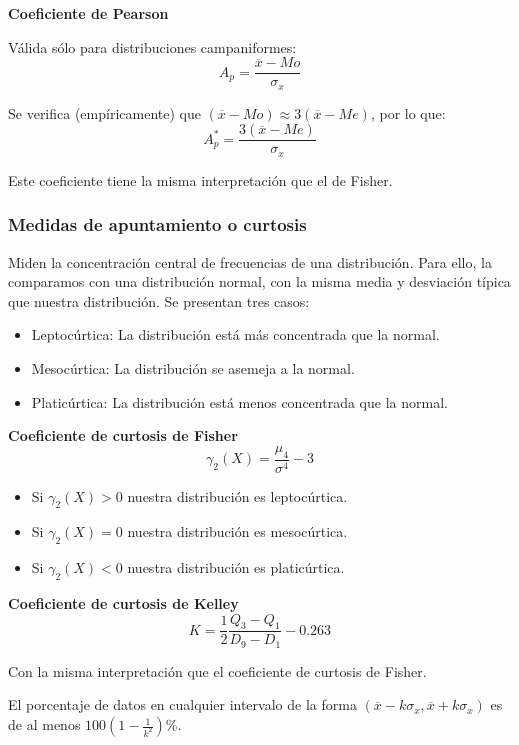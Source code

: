 \textbf{Coeficiente de Pearson}

Válida sólo para distribuciones campaniformes:
$$A_p = \dfrac{\overline{x} - Mo}{\sigma_x}$$

Se verifica (empíricamente) que $(\overline{x}-Mo) \approx 3(\overline{x}-Me)$, por lo que:
$$A_p^\ast = \dfrac{3(\overline{x} - Me)}{\sigma_x}$$

Este coeficiente tiene la misma interpretación que el de Fisher.


\subsubsection{Medidas de apuntamiento o curtosis}


Miden la concentración central de frecuencias de una distribución. Para ello, la comparamos con una distribución
normal, con la misma media y desviación típica que nuestra distribución.
Se presentan tres casos:
\begin{itemize}
    \item Leptocúrtica: La distribución está más concentrada que la normal.
    \item Mesocúrtica: La distribución se asemeja a la normal.
    \item Platicúrtica: La distribución está menos concentrada que la normal.
\end{itemize}

\textbf{Coeficiente de curtosis de Fisher}
$$\gamma_2(X) = \dfrac{\mu_4}{\sigma^4} - 3$$
\begin{itemize}
    \item Si $\gamma_2(X) > 0$ nuestra distribución es leptocúrtica.
    \item Si $\gamma_2(X) = 0$ nuestra distribución es mesocúrtica.
    \item Si $\gamma_2(X) < 0$ nuestra distribución es platicúrtica.
\end{itemize}

\textbf{Coeficiente de curtosis de Kelley}
$$K = \dfrac{1}{2} \dfrac{Q_3 - Q_1}{D_9 - D_1} - 0.263$$

Con la misma interpretación que el coeficiente de curtosis de Fisher.\\


\begin{teo}
    El porcentaje de datos en cualquier intervalo de la forma $(\overline{x} - k\sigma_x, \overline{x}+k\sigma_x)$ es de al menos $100(1-\frac{1}{k^2})$\%.
\end{teo}
